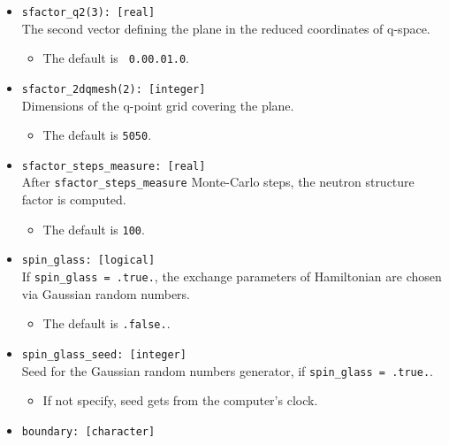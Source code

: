 \documentclass[10pt]{report}
\begin{document}
\begin{itemize}
\begin{itemize} [label=\adfhalfrightarrowhead]
\end{itemize}
\item {\tt sfactor\_q2(3): [real]}                       \\
The second vector defining the plane in the reduced coordinates of q-space.
\begin{itemize} [label=\adfhalfrightarrowhead]
\item  The default is {\tt\hspace{0.5cm} 0.0\hspace{1cm}0.0\hspace{1cm}1.0}.
\end{itemize}
\item {\tt sfactor\_2dqmesh(2): [integer]}                  \\
Dimensions of the q-point grid covering the plane.
\begin{itemize} [label=\adfhalfrightarrowhead]
\item  The default is {\tt \hspace{0.5cm}50\hspace{1cm}50}.
\end{itemize}
\item {\tt sfactor\_steps\_measure: [real]}         \\
After {\tt sfactor\_steps\_measure} Monte-Carlo steps, the neutron structure factor is computed.
\begin{itemize} [label=\adfhalfrightarrowhead]
\item The default is {\tt 100}.
\end{itemize}
\item {\tt spin\_glass: [logical]}                       \\
If {\tt spin\_glass = .true.}, the exchange parameters of Hamiltonian are chosen via Gaussian random numbers.
\begin{itemize} [label=\adfhalfrightarrowhead]
\item The default is {\tt .false.}.
\end{itemize}
\item {\tt spin\_glass\_seed: [integer]}               \\
Seed for the Gaussian random numbers generator, if {\tt spin\_glass = .true.}. 
\begin{itemize} [label=\adfhalfrightarrowhead]
\item If not specify, seed gets from the computer's clock.
\end{itemize}
\item {\tt boundary: [character]}\\

\end{itemize}
\end{document}
